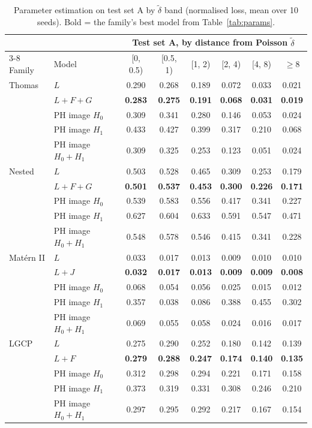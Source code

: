 \documentclass[10pt,a4paper]{article}
\newcommand{\dtil}{\tilde\delta}
\newcommand{\B}[1]{\textbf{#1}}
\begin{document}
\begin{table}[ht]
\centering\small
\begin{tabular}{@{}ll cccccc@{}}
\toprule
 & & \multicolumn{6}{c}{Test set A, by distance from Poisson $\dtil$}\\
\cmidrule(l){3-8}
Family & Model & [0, 0.5) & [0.5, 1) & [1, 2) & [2, 4) & [4, 8) & $\ge 8$\\
\midrule
Thomas & $L$ & 0.290 & 0.268 & 0.189 & 0.072 & 0.033 & 0.021\\
 & \B{$L{+}F{+}G$} & \B{0.283} & \B{0.275} & \B{0.191} & \B{0.068} & \B{0.031} & \B{0.019}\\
 & PH image $H_0$ & 0.309 & 0.341 & 0.280 & 0.146 & 0.053 & 0.024\\
 & PH image $H_1$ & 0.433 & 0.427 & 0.399 & 0.317 & 0.210 & 0.068\\
 & PH image $H_0{+}H_1$ & 0.309 & 0.325 & 0.253 & 0.123 & 0.051 & 0.024\\
\midrule
Nested & $L$ & 0.503 & 0.528 & 0.465 & 0.309 & 0.253 & 0.179\\
 & \B{$L{+}F{+}G$} & \B{0.501} & \B{0.537} & \B{0.453} & \B{0.300} & \B{0.226} & \B{0.171}\\
 & PH image $H_0$ & 0.539 & 0.583 & 0.556 & 0.417 & 0.341 & 0.227\\
 & PH image $H_1$ & 0.627 & 0.604 & 0.633 & 0.591 & 0.547 & 0.471\\
 & PH image $H_0{+}H_1$ & 0.548 & 0.578 & 0.546 & 0.415 & 0.341 & 0.228\\
\midrule
Mat\'ern II & $L$ & 0.033 & 0.017 & 0.013 & 0.009 & 0.010 & 0.010\\
 & \B{$L{+}J$} & \B{0.032} & \B{0.017} & \B{0.013} & \B{0.009} & \B{0.009} & \B{0.008}\\
 & PH image $H_0$ & 0.068 & 0.054 & 0.056 & 0.025 & 0.015 & 0.012\\
 & PH image $H_1$ & 0.357 & 0.038 & 0.086 & 0.388 & 0.455 & 0.302\\
 & PH image $H_0{+}H_1$ & 0.069 & 0.055 & 0.058 & 0.024 & 0.016 & 0.017\\
\midrule
LGCP & $L$ & 0.275 & 0.290 & 0.252 & 0.180 & 0.142 & 0.139\\
 & \B{$L{+}F$} & \B{0.279} & \B{0.288} & \B{0.247} & \B{0.174} & \B{0.140} & \B{0.135}\\
 & PH image $H_0$ & 0.312 & 0.298 & 0.294 & 0.221 & 0.171 & 0.158\\
 & PH image $H_1$ & 0.373 & 0.319 & 0.331 & 0.308 & 0.246 & 0.210\\
 & PH image $H_0{+}H_1$ & 0.297 & 0.295 & 0.292 & 0.217 & 0.167 & 0.154\\
\bottomrule
\end{tabular}
\caption{Parameter estimation on test set A by $\dtil$ band (normalised loss, mean over 10 seeds). Bold = the family's best model from Table~\ref{tab:params}.}
\label{tab:params-delta}
\end{table}
\end{document}
